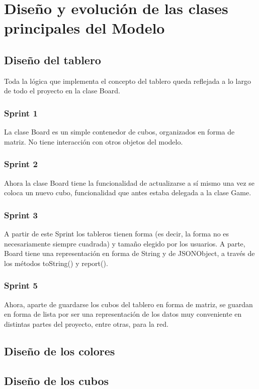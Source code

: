 \documentclass{article}
\theoremstyle{break}
\begin{document}
\graphicspath{{./fotos/}}


\section{Diseño y evolución de las clases principales del Modelo}
\subsection{Diseño del tablero}
Toda la lógica que implementa el concepto del tablero queda reflejada a lo largo de todo el proyecto en la clase Board.
\subsubsection{Sprint 1}
La clase Board es un simple contenedor de cubos, organizados en forma de matriz.
No tiene interacción con otros objetos del modelo.
\subsubsection{Sprint 2}
Ahora la clase Board tiene la funcionalidad de actualizarse a sí mismo una vez se coloca un nuevo cubo, funcionalidad que antes estaba delegada a la clase Game.
\subsubsection{Sprint 3}
A partir de este Sprint los tableros tienen forma (es decir, la forma no es necesariamente siempre cuadrada) y tamaño elegido por los usuarios. A parte, Board tiene una representación en forma de String y de JSONObject, a través de los métodos toString() y report().
\subsubsection{Sprint 5}
Ahora, aparte de guardarse los cubos del tablero en forma de matriz, se guardan en forma de lista por ser una representación de los datos muy conveniente en distintas partes del proyecto, entre otras, para la red.

\subsection{Diseño de los colores}

\subsection{Diseño de los cubos}
\end{document}
